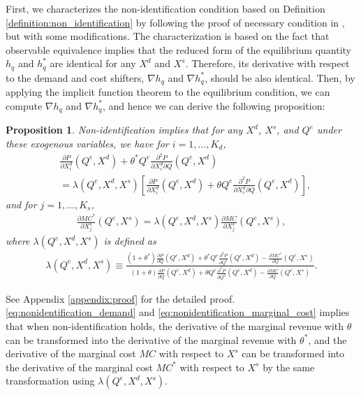 \documentclass[11pt, a4paper]{article}
\newtheorem{proposition}{Proposition}
\theoremstyle{remark}
\begin{document}
First, we characterizes the non-identification condition based on Definition \ref{definition:non_identification} by following the proof of necessary condition in \citet{lau1982identifying}, but with some modifications.
The characterization is based on the fact that observable equivalence implies that the reduced form of the equilibrium quantity $h_q$ and $h_q^{*}$ are identical for any $X^{d}$ and $X^{s}$.
Therefore, its derivative with respect to the demand and cost shifters, $\nabla h_q$ and $\nabla h_q^{*}$, should be also identical.
Then, by applying the implicit function theorem to the equilibrium condition, we can compute $\nabla h_q$ and $\nabla h_q^{*}$, and hence we can derive the following proposition:
\begin{proposition}\label{proposition:nonidentification_charaterization}
    Non-identification implies that for any $X^{d}$, $X^{s}$, and $Q^e$ under these exogenous variables, we have for $i = 1, \ldots, K_d$,
    \begin{align}
        &\frac{\partial P}{\partial X^{d}_{i}}(Q^e, X^{d}) + \theta^{*} Q^e \frac{\partial^2 P}{\partial X^{d}_{i}\partial Q}(Q^e, X^{d})\\  
        &= \lambda(Q^e, X^{d}, X^{s})\left[ \frac{\partial P}{\partial X^{d}_{i}}(Q^e, X^{d}) + \theta Q^e \frac{\partial^2 P}{\partial X^{d}_{i}\partial Q}(Q^e, X^{d}) \right], \label{eq:nonidentification_demand}
    \end{align}
    and for $j = 1,\ldots, K_s$,
    \begin{align}
        \frac{\partial MC^{*}}{\partial X^{s}_j}(Q^e, X^{s}) = \lambda(Q^e, X^{d}, X^{s}) \frac{\partial MC}{\partial X^{s}_j}(Q^e, X^{s}),\label{eq:nonidentification_marginal_cost}
    \end{align}
    where $\lambda(Q^e, X^{d}, X^{s})$ is defined as
    \begin{align}
        \lambda(Q^e, X^{d}, X^{s}) \equiv \frac{(1+\theta^{*})\frac{\partial P}{\partial Q}(Q^e, X^{d}) + \theta^{*} Q^e\frac{\partial^2 P}{\partial Q^2}(Q^e, X^{d}) - \frac{\partial MC^{*}}{\partial Q}(Q^e, X^{s})}{(1+\theta)\frac{\partial P}{\partial Q}(Q^e, X^{d}) + \theta Q^e\frac{\partial^2 P}{\partial Q^2}(Q^e, X^{d}) - \frac{\partial MC}{\partial Q}(Q^e, X^{s})}. \label{eq:lambda_foc}
    \end{align}
\end{proposition}
See Appendix \ref{appendix:proof} for the detailed proof.
\eqref{eq:nonidentification_demand} and \eqref{eq:nonidentification_marginal_cost} implies that when non-identification holds, the derivative of the marginal revenue with $\theta$ can be transformed into the derivative of the marginal revenue with $\theta^{*}$, and the derivative of the marginal cost $MC$ with respect to $X^{s}$ can be transformed into the derivative of the marginal cost $MC^{*}$ with respect to $X^{s}$ by the same transformation using $\lambda(Q^e, X^{d}, X^{s})$.
\end{document}
